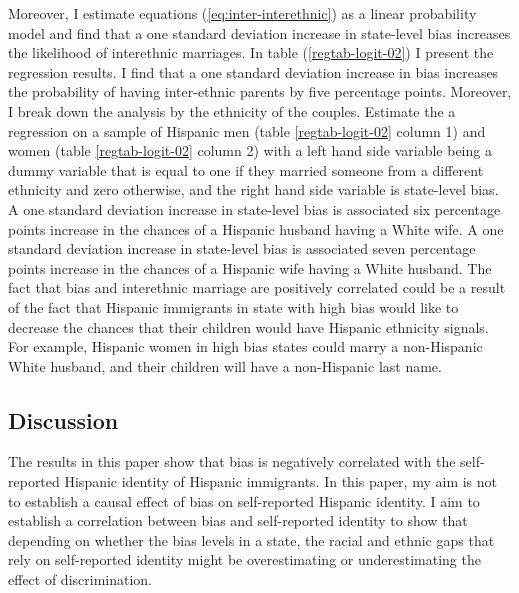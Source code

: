 \documentclass[12pt, fullpage]{article}
\begin{document}
Moreover, I estimate equations (\ref{eq:inter-interethnic}) as a linear probability model and find that a one standard deviation increase in state-level bias increases the likelihood of interethnic marriages. In table (\ref{regtab-logit-02}) I present the regression results. I find that a one standard deviation increase in bias increases the probability of having inter-ethnic parents by five percentage points. Moreover, I break down the analysis by the ethnicity of the couples. Estimate the a regression on a sample of Hispanic men (table \ref{regtab-logit-02} column 1) and women (table \ref{regtab-logit-02} column 2) with a left hand side variable being a dummy variable that is equal to one if they married someone from a different ethnicity and zero otherwise, and the right hand side variable is state-level bias. A one standard deviation increase in state-level bias is associated six percentage points increase in the chances of a Hispanic husband having a White wife. A one standard deviation increase in state-level bias is associated seven percentage points increase in the chances of a Hispanic wife having a White husband. The fact that bias and interethnic marriage are positively correlated could be a result of the fact that Hispanic immigrants in state with high bias would like to decrease the chances that their children would have Hispanic ethnicity signals. For example, Hispanic women in high bias states could marry a non-Hispanic White husband, and their children will have a non-Hispanic last name.



\subsection{Discussion} \label{subsec:disc}

The results in this paper show that bias is negatively correlated with the self-reported Hispanic identity of Hispanic immigrants. In this paper, my aim is not to establish a causal effect of bias on self-reported Hispanic identity. I aim to establish a correlation between bias and self-reported identity to show that depending on whether the bias levels in a state, the racial and ethnic gaps that rely on self-reported identity might be overestimating or underestimating the effect of discrimination. 
\end{document}
